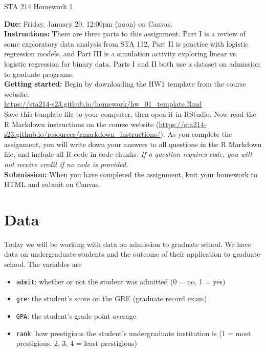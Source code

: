 \documentclass[11pt]{article}
\begin{document}
\begin{center}
\Large
STA 214 Homework 1\\
\normalsize
\vspace{5mm}
\end{center}

\noindent \textbf{Due:} Friday, January 20, 12:00pm (noon) on Canvas.\\ 

\noindent \textbf{Instructions:} There are three parts to this assignment. Part I is a review of some exploratory data analysis from STA 112, Part II is practice with logistic regression models, and Part III is a simulation activity exploring linear vs. logistic regression for binary data. Parts I and II both use a dataset on admission to graduate programs.\\

\noindent \textbf{Getting started:} Begin by downloading the HW1 template from the course website:\\

\url{https://sta214-s23.github.io/homework/hw_01_template.Rmd}\\

\noindent Save this template file to your computer, then open it in RStudio. Now read the R Markdown instructions on the course website (\url{https://sta214-s23.github.io/resources/rmarkdown_instructions/}). As you complete the assignment, you will write down your answers to all questions in the R Markdown file, and include all R code in code chunks. \textit{If a question requires code, you will not receive credit if no code is provided.}\\

\noindent \textbf{Submission:} When you have completed the assignment, knit your homework to HTML and submit on Canvas.

\section*{Data}

Today we will be working with data on admission to graduate school. We have data on undergraduate students and the outcome of their application to graduate school. The variables are

\begin{itemize}
\item \texttt{admit}: whether or not the student was admitted (0 = no, 1 = yes)
\item \texttt{gre}: the student's score on the GRE (graduate record exam)
\item \texttt{GPA}: the student's grade point average
\item \texttt{rank}: how prestigious the student's undergraduate institution is (1 = most prestigious, 2, 3, 4 = least prestigious)
\end{itemize}
\end{document}
